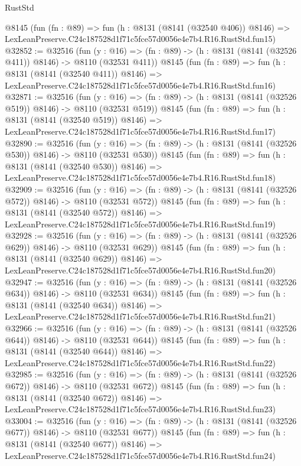 \begin{lexlean}{RustStd}
\begin{coremodule}
    @8145
    (fun (fn : @89) =>
    fun (h : @8131 (@8141 (@32540 @406)) @8146) =>
    LexLeanPreserve.C24c187528d1f71c5fce57d0056e4e7b4.R16.RustStd.fun15)
@32852 := @32516
    (fun (y : @16) => (fn : @89) -> (h : @8131 (@8141 (@32526 @411)) @8146) -> @8110 (@32531 @411))
    @8145
    (fun (fn : @89) =>
    fun (h : @8131 (@8141 (@32540 @411)) @8146) =>
    LexLeanPreserve.C24c187528d1f71c5fce57d0056e4e7b4.R16.RustStd.fun16)
@32871 := @32516
    (fun (y : @16) => (fn : @89) -> (h : @8131 (@8141 (@32526 @519)) @8146) -> @8110 (@32531 @519))
    @8145
    (fun (fn : @89) =>
    fun (h : @8131 (@8141 (@32540 @519)) @8146) =>
    LexLeanPreserve.C24c187528d1f71c5fce57d0056e4e7b4.R16.RustStd.fun17)
@32890 := @32516
    (fun (y : @16) => (fn : @89) -> (h : @8131 (@8141 (@32526 @530)) @8146) -> @8110 (@32531 @530))
    @8145
    (fun (fn : @89) =>
    fun (h : @8131 (@8141 (@32540 @530)) @8146) =>
    LexLeanPreserve.C24c187528d1f71c5fce57d0056e4e7b4.R16.RustStd.fun18)
@32909 := @32516
    (fun (y : @16) => (fn : @89) -> (h : @8131 (@8141 (@32526 @572)) @8146) -> @8110 (@32531 @572))
    @8145
    (fun (fn : @89) =>
    fun (h : @8131 (@8141 (@32540 @572)) @8146) =>
    LexLeanPreserve.C24c187528d1f71c5fce57d0056e4e7b4.R16.RustStd.fun19)
@32928 := @32516
    (fun (y : @16) => (fn : @89) -> (h : @8131 (@8141 (@32526 @629)) @8146) -> @8110 (@32531 @629))
    @8145
    (fun (fn : @89) =>
    fun (h : @8131 (@8141 (@32540 @629)) @8146) =>
    LexLeanPreserve.C24c187528d1f71c5fce57d0056e4e7b4.R16.RustStd.fun20)
@32947 := @32516
    (fun (y : @16) => (fn : @89) -> (h : @8131 (@8141 (@32526 @634)) @8146) -> @8110 (@32531 @634))
    @8145
    (fun (fn : @89) =>
    fun (h : @8131 (@8141 (@32540 @634)) @8146) =>
    LexLeanPreserve.C24c187528d1f71c5fce57d0056e4e7b4.R16.RustStd.fun21)
@32966 := @32516
    (fun (y : @16) => (fn : @89) -> (h : @8131 (@8141 (@32526 @644)) @8146) -> @8110 (@32531 @644))
    @8145
    (fun (fn : @89) =>
    fun (h : @8131 (@8141 (@32540 @644)) @8146) =>
    LexLeanPreserve.C24c187528d1f71c5fce57d0056e4e7b4.R16.RustStd.fun22)
@32985 := @32516
    (fun (y : @16) => (fn : @89) -> (h : @8131 (@8141 (@32526 @672)) @8146) -> @8110 (@32531 @672))
    @8145
    (fun (fn : @89) =>
    fun (h : @8131 (@8141 (@32540 @672)) @8146) =>
    LexLeanPreserve.C24c187528d1f71c5fce57d0056e4e7b4.R16.RustStd.fun23)
@33004 := @32516
    (fun (y : @16) => (fn : @89) -> (h : @8131 (@8141 (@32526 @677)) @8146) -> @8110 (@32531 @677))
    @8145
    (fun (fn : @89) =>
    fun (h : @8131 (@8141 (@32540 @677)) @8146) =>
    LexLeanPreserve.C24c187528d1f71c5fce57d0056e4e7b4.R16.RustStd.fun24)

\end{coremodule}
\end{lexlean}
